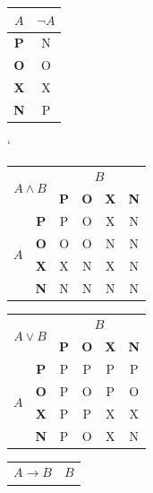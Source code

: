 \documentclass[a4paper, 11pt]{article}
\begin{document}
       \begin{table}[ht]
    \begin{center}
        \begin{tabular}{|c|c|}
        \hline
        $A$          & $\neg A$ \\ \hline
        \textbf{P} & N \\ \hline
        \textbf{O} & O \\ \hline
        \textbf{X} & X \\ \hline
        \textbf{N} & P \\ \hline
        \end{tabular}
        \catcode` 
        \begin{tabular}{|c|c|c|c|c|c|} \hline
        \multicolumn{2}{|c|}{\multirow{2}{*}{$ A \wedge B $}} & \multicolumn{4}{c|}{$B$} \\ \cline{3-6} 
        \multicolumn{2}{|c|}{}   & \textbf{P} & \textbf{O} & \textbf{X} & \textbf{N} \\\hline
        \multirow{4}{*}{$ A $}   & \textbf{P} & P & O & X & N \\\cline{2-6} 
                                 & \textbf{O }& O & O & N & N \\ \cline{2-6} 
                                 & \textbf{X} & X & N & X & N \\ \cline{2-6} 
                                 & \textbf{N} & N & N & N & N \\ \hline
        \end{tabular}
        \begin{tabular}{|c|c|c|c|c|c|} \hline
        \multicolumn{2}{|c|}{\multirow{2}{*}{$A \vee B$}} & \multicolumn{4}{c|}{$B$} \\ \cline{3-6} 
        \multicolumn{2}{|c|}{}   & \textbf{P} & \textbf{O} & \textbf{X} & \textbf{N} \\\hline
        \multirow{4}{*}{$ A $}   & \textbf{P} & P & P & P & P \\\cline{2-6} 
                                 & \textbf{O }& P & O & P & O \\ \cline{2-6} 
                                 & \textbf{X} & P & P & X & X \\ \cline{2-6} 
                                 & \textbf{N} & P & O & X & N \\ \hline
        \end{tabular}
          \begin{tabular}{|c|c|c|c|c|c|} \hline
        \multicolumn{2}{|c|}{\multirow{2}{*}{$A \rightarrow B$}} & \multicolumn{4}{c|}{$B$} \\ \cline{3-6} 

\end{tabular}
\end{center}
\end{table}
\end{document}
